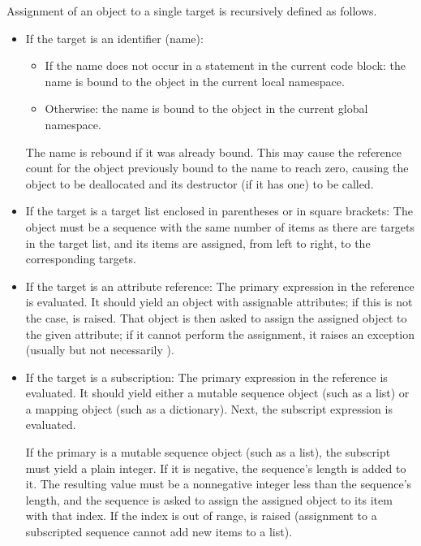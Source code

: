 Assignment of an object to a single target is recursively defined as
follows.

\begin{itemize} %

\item
If the target is an identifier (name):

\begin{itemize}

\item
If the name does not occur in a  statement in the current
code block: the name is bound to the object in the current local
namespace.

\item
Otherwise: the name is bound to the object in the current global
namespace.

\end{itemize} %

The name is rebound if it was already bound.  This may cause the
reference count for the object previously bound to the name to reach
zero, causing the object to be deallocated and its
destructor (if it has one) to be called.

\item
If the target is a target list enclosed in parentheses or in square
brackets: The object must be a sequence with the same number of items
as there are targets in the target list, and its items are assigned,
from left to right, to the corresponding targets.

\item
If the target is an attribute reference: The primary expression in the
reference is evaluated.  It should yield an object with assignable
attributes; if this is not the case,  is raised.  That
object is then asked to assign the assigned object to the given
attribute; if it cannot perform the assignment, it raises an exception
(usually but not necessarily ).

\item
If the target is a subscription: The primary expression in the
reference is evaluated.  It should yield either a mutable sequence
object (such as a list) or a mapping object (such as a dictionary). Next,
the subscript expression is evaluated.

If the primary is a mutable sequence object (such as a list), the subscript
must yield a plain integer.  If it is negative, the sequence's length
is added to it.  The resulting value must be a nonnegative integer
less than the sequence's length, and the sequence is asked to assign
the assigned object to its item with that index.  If the index is out
of range,  is raised (assignment to a subscripted
sequence cannot add new items to a list).


\end{itemize}
